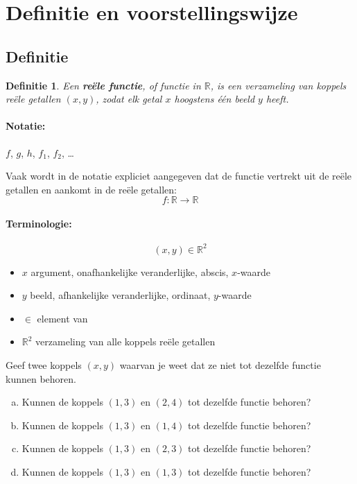 \documentclass[12pt,twoside]{article}
\newtheorem{definition}{Definitie}
\begin{document}
\pagebreak

\section{Definitie en voorstellingswijze}

\begin{theorie}

\subsection{Definitie}

\begin{definition}
  Een {\bf reële functie}, of functie in $\mathbb{R}$, is een verzameling van {\em koppels} reële getallen $(x,y)$, zodat elk getal $x$ {\em hoogstens één beeld} $y$ heeft.
\end{definition}

\paragraph{Notatie:} $f$, $g$, $h$, $f_1$, $f_2$, \ldots

Vaak wordt in de notatie expliciet aangegeven dat de functie vertrekt uit de reële getallen en aankomt in de reële getallen:
$$f:\mathbb{R}\to\mathbb{R}$$

\paragraph{Terminologie:}
$$(x,y) \in \mathbb{R}^2$$
\begin{itemize}
  \item $x$ argument, onafhankelijke veranderlijke, abscis, $x$-waarde
  \item $y$ beeld, afhankelijke veranderlijke, ordinaat, $y$-waarde
  \item $\in$ element van
  \item $\mathbb{R}^2$ verzameling van alle koppels reële getallen
\end{itemize}

\end{theorie}

\begin{oefening}
  Geef twee koppels $(x,y)$ waarvan je weet dat ze niet tot dezelfde functie kunnen behoren.
\end{oefening}

\begin{oefening}
\begin{enumerate}[(a)]
  \item Kunnen de koppels $(1,3)$ en $(2,4)$ tot dezelfde functie behoren?
  \item Kunnen de koppels $(1,3)$ en $(1,4)$ tot dezelfde functie behoren?
  \item Kunnen de koppels $(1,3)$ en $(2,3)$ tot dezelfde functie behoren?
  \item Kunnen de koppels $(1,3)$ en $(1,3)$ tot dezelfde functie behoren?
\end{enumerate}
\end{oefening}
\end{document}
